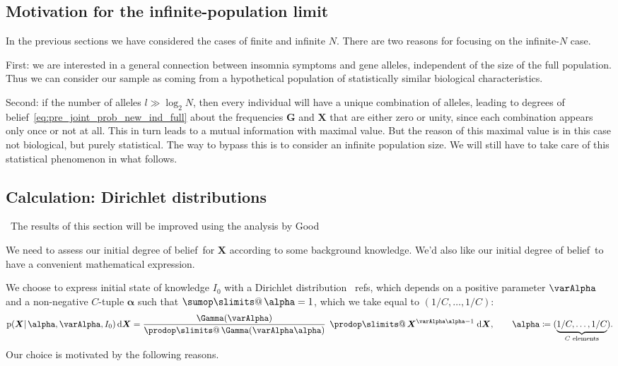 \documentclass[\ifafour a4paper,12pt,\else a5paper,10pt,\fi%
onecolumn,oneside,article,%
british%
]{memoir}
\makeatletter
\theoremstyle{remark}
\theoremstyle{innote}
\def\sum{\DOTSI\sumop\slimits@}
\def\prod{\DOTSI\prodop\slimits@}
\newcommand*{\citep}{\parencites}
\newcommand*{\citey}{\parencites*}
\newcommand*{\di}{\mathrm{d}}%
\newcommand*{\defd}{\coloneqq}
\newcommand*{\pf}{\mathrm{p}}%
\renewcommand*{\|}{\mathpunct{|}}
\newcommand*{\sect}{\S}%
\newcommand*{\chaps}{chs}%
\newcommand*{\tprod}{\mathop{\textstyle\prod}\nolimits}
\newcommand*{\tsum}{\mathop{\textstyle\sum}\nolimits}
\newcommand*{\puzzle}{\maltese}
\newcommand{\mynote}[1]{ {\color{notecolour}\puzzle\ #1}}
\newcommand*{\dob}{degree of belief}
\newcommand*{\dobs}{degrees of belief}
\newcommand*{\ysum}{\tsum}
\newcommand*{\yprod}{\tprod}
\newcommand*{\yFg}{\bm{G}}
\newcommand*{\yF}{\bm{X}}
\newcommand*{\yIo}{I_{0}}
\newcommand*{\yA}{\varAlpha}
\newcommand*{\ya}{\bm{\alpha}}
\makeatother
\begin{document}
\subsection{Motivation for the infinite-population limit}
\label{sec:pre_motivation_Ninf}

In the previous sections we have considered the cases of finite and
infinite $N$. There are two reasons for focusing on the infinite-$N$ case.

First: we are interested in a general connection between
insomnia symptoms and gene alleles, independent of the size of the full
population. Thus we can consider our sample as coming from a hypothetical
population of statistically similar biological characteristics.

Second: if the number of alleles $l\gg\log_{2}N$, then every individual
will have a unique combination of alleles, leading to \dobs\
\eqref{eq:pre_joint_prob_new_ind_full} about the frequencies $\yFg$ and $\yF$
that are either zero or unity, since each combination appears only once or
not at all. This in turn leads to a mutual information with maximal value.
But the reason of this maximal value is in this case not biological, but
purely statistical. The way to bypass this is to consider an infinite
population size. We will still have to take care of this statistical
phenomenon in what follows.

\subsection{Calculation: Dirichlet distributions}
\label{sec:pre_2nd_calculation_unif_marginals}

\mynote{The results of this section will be improved using the analysis by
  Good \citey[\chaps~4--5]{good1965}{good1980}}


We need to assess our initial \dob\ for $\yF$ according to some background
knowledge. We'd also like our initial \dob\ to have a convenient
mathematical expression.

We choose to express initial state of knowledge $\yIo$ with a Dirichlet
distribution \mynote{refs}, which depends on a positive parameter $\yA$ and
a non-negative $C$-tuple $\ya$ such that $\ysum\ya=1$, which we take equal
to $(1/C,\dotsc,1/C)$:
\begin{equation}
  \label{eq:pre_dirichlet_prior}
  \pf(\yF \| \ya, \yA,\yIo)\,\di\yF =
  \frac{\Gamma(\yA)}{\yprod\Gamma(\yA\ya)}\;
  \yprod \yF^{\yA\ya-1}\;\di\yF,\qquad
  \ya \defd (\underbrace{1/C,\dotsc,1/C}_{\text{$C$ elements}}).
\end{equation}
Our choice is motivated by the following reasons.
\end{document}
